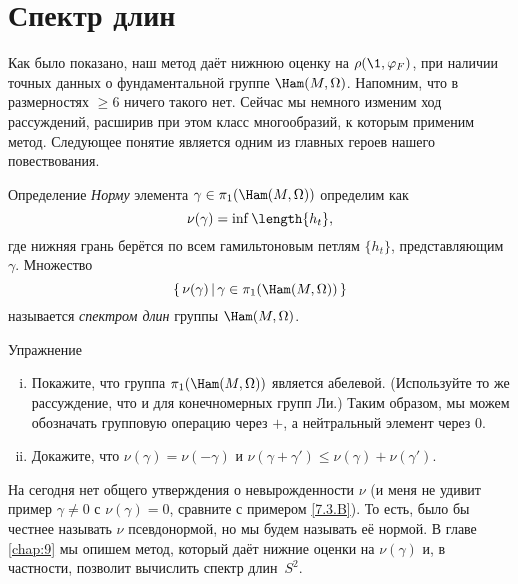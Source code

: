 \section{Спектр длин}\label{sec:7.3}

Как было показано, наш метод даёт нижнюю оценку на $\rho (\1, \phi_F)$, при наличии точных данных о фундаментальной группе $\Ham (M, \Omega)$.
Напомним, что в размерностях $\ge 6$ ничего такого нет.
Сейчас мы немного изменим ход рассуждений, расширив при этом класс многообразий, к которым применим метод.
Следующее понятие является одним из главных героев нашего повествования.

\begin{ex}{Определение}\label{7.3.A}
{}\emph{Норму} элемента $\gamma \in \pi_1 (\Ham (M, \Omega))$ определим как \index[symb]{$\nu(\gamma)$}
\[\nu(\gamma)=\inf\length\{h_t\},\]
где нижняя грань берётся по всем гамильтоновым петлям $\{h_t\}$, представляющим $\gamma$.
Множество 
\[\set{\nu (\gamma)}{\gamma \z\in \pi_1 (\Ham (M, \Omega))}\]
называется \emph{спектром длин} группы $\Ham (M, \Omega)$.
\end{ex}

\begin{ex*}{Упражнение}

\begin{enumerate}[(i)]
 \item Покажите, что группа $\pi_1 (\Ham (M, \Omega))$ является абелевой. (Используйте то же рассуждение, что и для конечномерных групп Ли.)
Таким образом, мы можем обозначать групповую операцию через $+$, а нейтральный элемент через $0$.
 \item Докажите, что $\nu (\gamma) = \nu (-\gamma)$ и $\nu (\gamma + \gamma') \le \nu (\gamma) + \nu (\gamma')$.
\end{enumerate}

\end{ex*}

На сегодня нет общего утверждения о невырожденности $\nu$ (и
меня не удивит пример $\gamma \ne 0$ с $\nu (\gamma) = 0$, сравните с
примером \ref{7.3.B}). 
То есть, было бы честнее называть $\nu$ псевдонормой, но мы будем
называть её нормой. 
В главе \ref{chap:9} мы опишем метод, который даёт нижние оценки
на $\nu (\gamma)$ и, в частности, позволит вычислить спектр
длин~$S^2$. 

